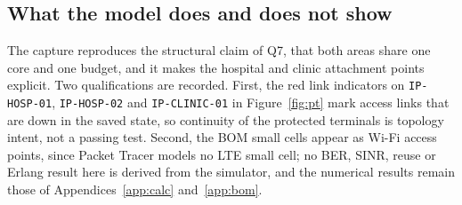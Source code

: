 \documentclass[9pt,a4paper]{article}
\begin{document}
\subsection{What the model does and does not show}
The capture reproduces the structural claim of Q7, that both areas share one core and one
budget, and it makes the hospital and clinic attachment points explicit. Two qualifications are
recorded. First, the red link indicators on \texttt{IP-HOSP-01}, \texttt{IP-HOSP-02} and
\texttt{IP-CLINIC-01} in Figure~\ref{fig:pt} mark access links that are down in the saved state,
so continuity of the protected terminals is topology intent, not a passing test. Second, the
BOM small cells appear as Wi-Fi access points, since Packet Tracer models no LTE small cell; no
BER, SINR, reuse or Erlang result here is derived from the simulator, and the numerical results
remain those of Appendices~\ref{app:calc} and~\ref{app:bom}.
\end{document}
